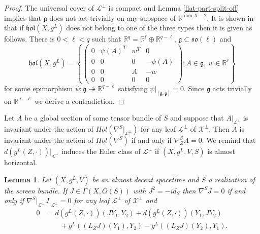 \documentclass[a4paper,10pt,twoside]{amsart}
\newtheorem{lemma}[theorem]{Lemma}
\theoremstyle{definition}
\theoremstyle{remark}
\numberwithin{equation}{section}
\begin{document}
\begin{proof}
	The universal cover of $\mathcal{L}^{\perp}$ is compact and Lemma \ref{flat-part-split-off} implies that ${\mathfrak{{g}}}$ does not act trivially on
	any subspace of ${\mathbb{R}}^{\dim X -2}$. It is shown in \cite{MR1216527} that if ${\mathfrak{{hol}}}(X,g^{L})$ does not belong to one of the three types then
	it is given as follows. There is $0< \ell < q$ such that ${\mathbb{R}}^{q} = {\mathbb{R}}^{\ell} \oplus {\mathbb{R}}^{q-\ell}$, ${\mathfrak{{g}}} \subset {\mathfrak{{so}}}(\ell)$ and
	\begin{equation*}
		{\mathfrak{{hol}}}(X,g^{L}) = \left\lbrace \begin{pmatrix}
							0 & \psi(A)^T & w^T & 0\\
							0 & 0 & 0 & -\psi(A)\\
							0 & 0 & A & -w\\
							0 & 0 & 0 & 0
						\end{pmatrix}: A \in {\mathfrak{{g}}},~w \in {\mathbb{R}}^{\ell}  \right\rbrace
	\end{equation*}
	for some epimorphism $\psi: {\mathfrak{{g}}} \twoheadrightarrow {\mathbb{R}}^{q-\ell}$ satisfying $\psi|_{[{\mathfrak{{g}}},{\mathfrak{{g}}}]}=0$. Since ${\mathfrak{{g}}}$ acts
	trivially on ${\mathbb{R}}^{q-\ell}$ we derive a contradiction.
\end{proof}
Let $A$ be a global section of some tensor bundle of $S$ and suppose that $A|_{\mathcal{L}^{\perp}}$ is invariant under the action of
$Hol(\nabla^{S}|_{\mathcal{L}^{\perp}})$ for any leaf $\mathcal{L}^{\perp}$ of $\mathcal{X}^{\perp}$. Then $A$ is invariant under the action of
$Hol(\nabla^{S})$ if and only if $\nabla^{S}_{Z}{A}=0$. We remind that $d(g^{L}(Z,\cdot))|_{\mathcal{L}^{\perp}}$ induces the Euler class of
$\mathcal{L}^{\perp}$ if $(X,g^{L},V,S)$ is almost horizontal.
\begin{lemma}
	Let $(X,g^{L},V)$ be an almost decent spacetime and $S$ a realization of the screen bundle. If $J \in \Gamma(X,O(S))$ with $J^{2}=-id_{S}$
	then $\nabla^{S}J=0$ if and only if $\nabla^{S}|_{\mathcal{L}^{\perp}}{J|_{\mathcal{L}^{\perp}}}=0$ for any leaf $\mathcal{L}^{\perp}$ of
	$\mathcal{X}^{\perp}$ and
	\begin{align*}
		0 &= d(g^{L}(Z,\cdot))(JY_{1},Y_{2}) + d(g^{L}(Z,\cdot))(Y_{1},JY_{2})\\
		 	&\qquad + g^{L}((L_{Z}{J})(Y_{1}),Y_{2}) - g^{L}((L_{Z}{J})(Y_{2}),Y_{1}).
	\end{align*}
\end{lemma}
\end{document}
